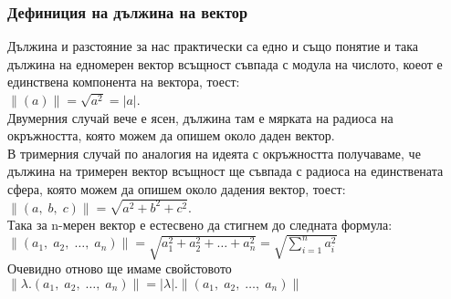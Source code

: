 \documentclass[12pt]{article}
\begin{document}
\subsubsection*{Дефиниция на дължина на вектор}

Дължина и разстояние за нас практически са едно и също понятие и така
дължина на едномерен вектор всъщност съвпада с модула на числото, коеот е единствена компонента на вектора, тоест:\\

$\|(a)\| = \sqrt{a^2} = |a|$. \\

Двумерния случай вече е ясен, дължина там е мярката на радиоса на окръжността, която можем да опишем около даден вектор. \\

В тримерния случай по аналогия на идеята с окръжността получаваме, че дължина на тримерен вектор всъщност
ще съвпада с радиоса на единствената сфера, която можем да опишем около дадения вектор, тоест: \\

$\|(a, \; b, \; c)\| = \sqrt{a^2 + b^2 + c^2}$. \\

Така за n-мерен вектор е естесвено да стигнем до следната формула: \\

$\|(a_1, \; a_2, \; \dots, \; a_n)\| = \sqrt{a_1^2 + a_2^2 + \dots + a_n^2} = \sqrt{\displaystyle\sum_{i = 1}^n a_i^2}$ \\

Очевидно отново ще имаме свойстовото $\|\lambda.(a_1, \; a_2, \; \dots, \; a_n)\| = |\lambda|.\|(a_1, \; a_2, \; \dots, \; a_n)\|$
\end{document}
